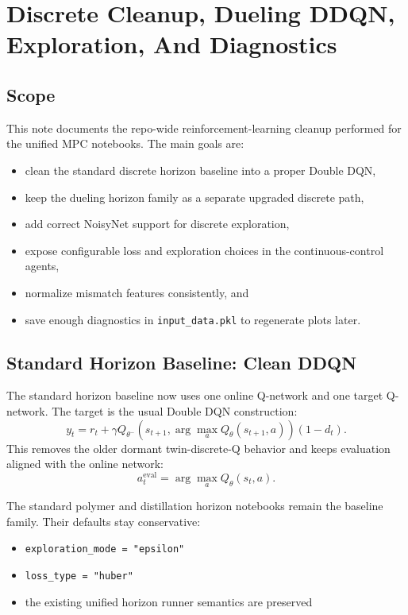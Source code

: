 \section{Discrete Cleanup, Dueling DDQN, Exploration, And Diagnostics}

\subsection{Scope}
This note documents the repo-wide reinforcement-learning cleanup performed for the unified MPC notebooks. The main goals are:
\begin{itemize}
  \item clean the standard discrete horizon baseline into a proper Double DQN,
  \item keep the dueling horizon family as a separate upgraded discrete path,
  \item add correct NoisyNet support for discrete exploration,
  \item expose configurable loss and exploration choices in the continuous-control agents,
  \item normalize mismatch features consistently, and
  \item save enough diagnostics in \texttt{input\_data.pkl} to regenerate plots later.
\end{itemize}

\subsection{Standard Horizon Baseline: Clean DDQN}
The standard horizon baseline now uses one online Q-network and one target Q-network. The target is the usual Double DQN construction:
\[
y_t = r_t + \gamma Q_{\theta^-}\!\left(s_{t+1}, \arg\max_a Q_{\theta}(s_{t+1}, a)\right)(1-d_t).
\]
This removes the older dormant twin-discrete-Q behavior and keeps evaluation aligned with the online network:
\[
a_t^{\mathrm{eval}} = \arg\max_a Q_{\theta}(s_t, a).
\]

The standard polymer and distillation horizon notebooks remain the baseline family. Their defaults stay conservative:
\begin{itemize}
  \item \texttt{exploration\_mode = "epsilon"}
  \item \texttt{loss\_type = "huber"}
  \item the existing unified horizon runner semantics are preserved
\end{itemize}

